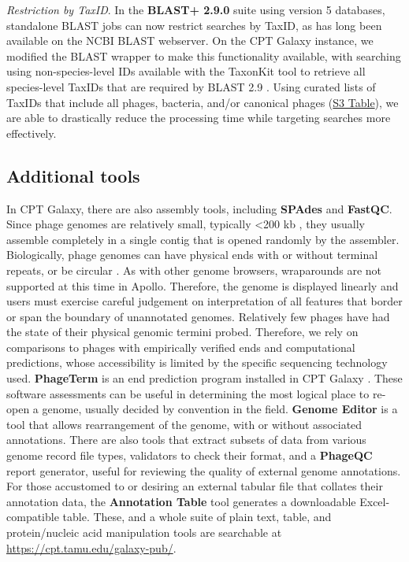 \emph{Restriction by TaxID}. In the \textbf{BLAST+ 2.9.0} suite using
version 5 databases, standalone BLAST jobs can now restrict searches by
TaxID, as has long been available on the NCBI BLAST webserver. On the
CPT Galaxy instance, we modified the BLAST wrapper to make this
functionality available, with searching using non-species-level IDs
available with the TaxonKit tool to retrieve all species-level TaxIDs
that are required by BLAST 2.9 \cite{Shen_2019}. Using curated lists of TaxIDs
that include all phages, bacteria, and/or canonical phages
(\protect\hyperlink{pcbi.1008214.s003}{S3 Table}), we are able to
drastically reduce the processing time while targeting searches more
effectively.

\subsection*{Additional tools}

In CPT Galaxy, there are also assembly tools, including \textbf{SPAdes}
and \textbf{FastQC}. Since phage genomes are relatively small, typically
\textless200 kb \cite{Dion_2020}, they usually assemble completely in a single
contig that is opened randomly by the assembler. Biologically, phage
genomes can have physical ends with or without terminal repeats, or be
circular \cite{Merrill_2016}. As with other genome browsers, wraparounds are not
supported at this time in Apollo. Therefore, the genome is displayed
linearly and users must exercise careful judgement on interpretation of
all features that border or span the boundary of unannotated genomes.
Relatively few phages have had the state of their physical genomic
termini probed. Therefore, we rely on comparisons to phages with
empirically verified ends and computational predictions, whose
accessibility is limited by the specific sequencing technology used.
\textbf{PhageTerm} is an end prediction program installed in CPT Galaxy
\cite{Garneau_2017}. These software assessments can be useful in determining the
most logical place to re-open a genome, usually decided by convention in
the field. \textbf{Genome Editor} is a tool that allows rearrangement of
the genome, with or without associated annotations. There are also tools
that extract subsets of data from various genome record file types,
validators to check their format, and a \textbf{PhageQC} report
generator, useful for reviewing the quality of external genome
annotations. For those accustomed to or desiring an external tabular
file that collates their annotation data, the \textbf{Annotation Table}
tool generates a downloadable Excel-compatible table. These, and a whole
suite of plain text, table, and protein/nucleic acid manipulation tools
are searchable at \url{https://cpt.tamu.edu/galaxy-pub/}.

